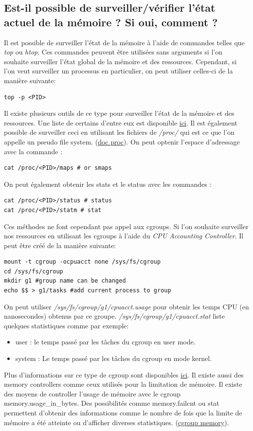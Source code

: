 \documentclass{ReportTemplate}
\begin{document}
\subsection{Est-il possible de surveiller/vérifier l’état actuel de la mémoire ? Si oui, comment ?}
Il est possible de surveiller l'état de la mémoire à l'aide de commandes telles
que \textit{top} ou \textit{htop}. Ces commandes peuvent être utilisées sans
arguments si l'on souhaite surveiller l'état global de la mémoire et des
ressources. Cependant, si l'on veut surveiller un processus en particulier, on
peut utiliser celles-ci de la manière suivante:
\begin{verbatim}
top -p <PID>
\end{verbatim}
Il existe plusieurs outils de ce type pour surveiller l'état de la mémoire et
des ressources. Une liste de certains d'entre eux est disponible
\href{https://geekflare.com/fr/process-cpu-memory-monitoring/}{ici}.
Il est également possible de surveiller ceci en utilisant les fichiers de
\textit{/proc/} qui est ce que l'on appelle un pseudo file system.
(\href{https://man7.org/linux/man-pages/man5/proc.5.html}{doc proc}).
On peut optenir l'espace d'adressage avec la commande :
\begin{verbatim}
cat /proc/<PID>/maps # or smaps
\end{verbatim}
On peut également obtenir les stats et le status avec les commandes :
\begin{verbatim}
cat /proc/<PID>/status # status
cat /proc/<PID>/statm # stat
\end{verbatim}
Ces méthodes ne font cependant pas appel aux cgroups. Si l'on souhaite
surveiller nos ressources en utilisant les cgroups à l'aide du \textit{CPU
Accounting Controller}. Il peut être créé de la manière suivante:
\begin{verbatim}
mount -t cgroup -ocpuacct none /sys/fs/cgroup
cd /sys/fs/cgroup
mkdir g1 #group name can be changed 
echo $$ > g1/tasks #add current process to group
\end{verbatim}
On peut utiliser \textit{/sys/fs/cgroup/g1/cpuacct.usage} pour obtenir les temps
CPU (en nanosecondes) obtenus par ce groupe.
\textit{/sys/fs/cgroup/g1/cpuacct.stat} liste quelques statistiques comme par
exemple:
\begin{itemize}
    \item user : le temps passé par les tâches du cgroup en user mode.
    \item system : Le temps passé par les tâches du cgroup en mode kernel.
\end{itemize}
Plus d'informations sur ce type de cgroup sont disponibles
\href{https://www.kernel.org/doc/html/latest/admin-guide/cgroup-v1/cpuacct.html}{ici}.
\newline
Il existe aussi des memory controllers comme ceux utilisés pour la limitation de
mémoire. Il existe des moyens de controller l'usage de mémoire avec le cgroup
memory.usage\_in\_bytes. Des possibilités comme memory.failcnt ou stat
permettent d'obtenir des informations comme le nombre de fois que la limite de
mémoire a été atteinte ou d'afficher diverses statistiques.
(\href{https://www.kernel.org/doc/html/latest/admin-guide/cgroup-v1/memory.html}{cgroup
memory}).
\end{document}
